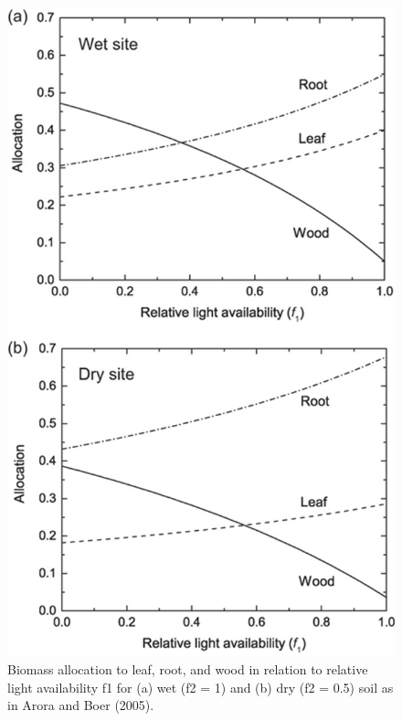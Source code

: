 \documentclass[12pt,oneside]{book}
\begin{document}
\begin{figure}

{\centering \includegraphics[width=0.8\linewidth]{figures/chap5/f58_alloc_factors} 

}

\caption{Biomass allocation to leaf, root, and wood in relation to relative light availability f1 for (a) wet (f2 = 1) and (b) dry (f2 = 0.5) soil as in Arora and Boer (2005).}\label{fig:f58}
\end{figure}
\end{document}

